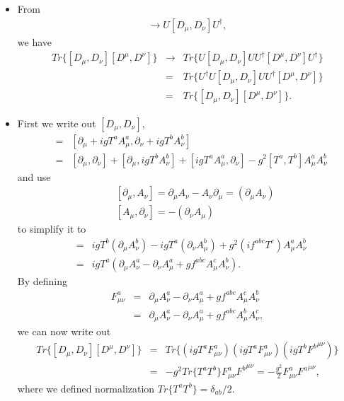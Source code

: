 \documentclass[11pt]{article}
\def\del{{\partial}}
\begin{document}
\section{ }
\begin{itemize}
    \item From
    \begin{eqnarray}
        [D_\mu,D_\nu] \to U [D_\mu,D_\nu] U^\dagger,
    \end{eqnarray}
    we have
    \begin{eqnarray}
        Tr\{ [D_\mu,D_\nu] [D^\mu,D^\nu] \} & \to& Tr\{ U [D_\mu,D_\nu] U U^\dagger [D^\mu,D^\nu] U^\dagger \} \\ &=& Tr\{ U^\dagger U [D_\mu,D_\nu] U U^\dagger [D^\mu,D^\nu] \} \\
        &=& Tr\{ [D_\mu,D_\nu] [D^\mu,D^\nu] \}.
    \end{eqnarray}
    \item First we write out $[D_\mu,D_\nu]$,
    \begin{eqnarray}
        [D_\mu,D_\nu] &=& [\del_\mu + ig T^a A^a_\mu,\del_\nu + ig T^b A^b_\nu] \\
        &=& [\del_\mu,\del_\nu]+ [\del_\mu, ig T^b A^b_\nu ]+ [ig T^a A^a_\mu, \del_\nu]- g^2 [T^a, T^b] A^a_\mu A^b_\nu
    \end{eqnarray}
    and use
    \begin{eqnarray}
        &&[\del_\mu, A_\nu ] = \del_\mu A_\nu -A_\nu \del_\mu = (\del_\mu A_\nu) \\
        &&[A_\mu, \del_\nu ] = -(\del_\nu A_\mu)      
    \end{eqnarray}
    to simplify it to
    \begin{eqnarray}
        [D_\mu,D_\nu] &=& ig T^b (\del_\mu A_\nu^b)-ig T^a (\del_\nu A_\mu^b)+ g^2 (i f^{abc} T^c) A^a_\mu A^b_\nu \\
        &=& ig T^a (\del_\mu A_\nu^a-\del_\nu A_\mu^a+g f^{abc} A^c_\mu A^b_\nu ).
    \end{eqnarray}
    By defining
    \begin{eqnarray}
        F^a_{\mu \nu} &=& \del_\mu A_\nu^a-\del_\nu A_\mu^a+g f^{abc} A^c_\mu A^b_\nu \\
        &=& \del_\mu A_\nu^a-\del_\nu A_\mu^a+g f^{abc} A^b_\mu A^c_\nu,
    \end{eqnarray}
    we can now write out
    \begin{eqnarray}
        Tr\{ [D_\mu,D_\nu] [D^\mu,D^\nu] \} &=& Tr\{ (ig T^a F^a_{\mu\nu})(ig T^a F^a_{\mu\nu})(ig T^b {F^b}^{\mu\nu}) \} \\
        &=& -g^2 Tr\{T^a T^b \} F^a_{\mu\nu} {F^b}^{\mu\nu} = -\frac{g^2}{2} F^a_{\mu\nu} {F^a}^{\mu\nu},
    \end{eqnarray}
    where we defined normalization $Tr\{T^a T^b \}= \delta_{ab}/2$.
\end{itemize}
\end{document}
